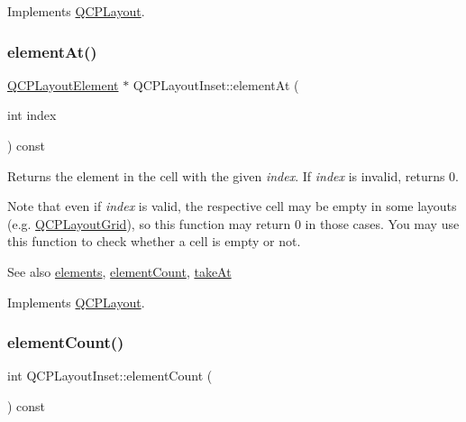 Implements \hyperlink{class_q_c_p_layout_afa73ca7d859f8a3ee5c73c9b353d2a56}{Q\+C\+P\+Layout}.

\mbox{\label{class_q_c_p_layout_inset_a881ca205605bae9c034733b808f93a02}} 
\subsubsection{\texorpdfstring{element\+At()}{elementAt()}\hspace{0.1cm}{\footnotesize\ttfamily [2/2]}}
{\footnotesize\ttfamily \hyperlink{class_q_c_p_layout_element}{Q\+C\+P\+Layout\+Element} $\ast$ Q\+C\+P\+Layout\+Inset\+::element\+At (\begin{DoxyParamCaption}\item[{int}]{index }\end{DoxyParamCaption}) const\hspace{0.3cm}{\ttfamily [virtual]}}

Returns the element in the cell with the given {\itshape index}. If {\itshape index} is invalid, returns 0.

Note that even if {\itshape index} is valid, the respective cell may be empty in some layouts (e.\+g. \hyperlink{class_q_c_p_layout_grid}{Q\+C\+P\+Layout\+Grid}), so this function may return 0 in those cases. You may use this function to check whether a cell is empty or not.

\begin{DoxySeeAlso}{See also}
\hyperlink{class_q_c_p_layout_aca129722c019f91d3367046f80abfa77}{elements}, \hyperlink{class_q_c_p_layout_inset_a7f5aa4d48a2e844cfe6dd7ed8f0861df}{element\+Count}, \hyperlink{class_q_c_p_layout_inset_abf2e8233f5b7051220907e62ded490a2}{take\+At} 
\end{DoxySeeAlso}


Implements \hyperlink{class_q_c_p_layout_afa73ca7d859f8a3ee5c73c9b353d2a56}{Q\+C\+P\+Layout}.

\mbox{\label{class_q_c_p_layout_inset_a7f5aa4d48a2e844cfe6dd7ed8f0861df}} 
\subsubsection{\texorpdfstring{element\+Count()}{elementCount()}\hspace{0.1cm}{\footnotesize\ttfamily [1/2]}}
{\footnotesize\ttfamily int Q\+C\+P\+Layout\+Inset\+::element\+Count (\begin{DoxyParamCaption}{ }\end{DoxyParamCaption}) const\hspace{0.3cm}{\ttfamily [virtual]}}

